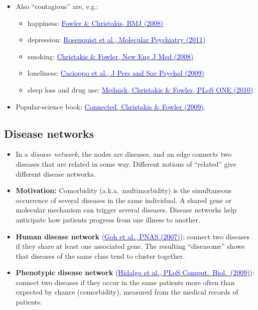 \documentclass[20pt]{extarticle}
\newcommand{\hrefc}[2]{\href{#1}{\textcolor{blue}{#2}}}
\begin{document}
\begin{itemize}
\item Also ``contagious'' are, e.g.:
	\begin{itemize}
	\item happiness: \hrefc{https://doi.org/10.1136/bmj.a2338}{Fowler \& Christakis, BMJ (2008)}
	\item depression: \hrefc{https://doi.org/10.1038/mp.2010.13}{Rosenquist et al., Molecular Psychiatry (2011)}
	\item smoking: \hrefc{https://doi.org/10.1056/NEJMsa0706154}{Christakis \& Fowler, New Eng J Med (2008)}
	\item loneliness: \hrefc{https://doi.org/10.1037/a0016076}{Cacioppo et al., J Pers and Soc Psychol (2009)}
	\item sleep loss and drug use: \hrefc{https://doi.org/10.1371/journal.pone.0009775}{Mednick, Christakis \& Fowler, PLoS ONE (2010)}
	\end{itemize}
\item Popular-science book: \hrefc{https://www.amazon.com/Connected-Surprising-Networks-Friends-Everything/dp/0316036137}{Connected, Christakis \& Fowler (2009)}.
\end{itemize}

\clearpage

\subsection*{Disease networks}

\begin{itemize}
\item In a \emph{disease network}, the nodes are diseases, and an edge connects two diseases that are related in some way. Different notions of ``related'' give different disease networks.
\item \textbf{Motivation:} Comorbidity (a.k.a.\ multimorbidity) is the simultaneous occurrence of several diseases in the same individual. A shared gene or molecular mechanism can trigger several diseases. Disease networks help anticipate how patients progress from one illness to another.
\item \textbf{Human disease network} (\hrefc{https://doi.org/10.1073/pnas.0701361104}{Goh et al., PNAS (2007)}): connect two diseases if they share at least one associated gene. The resulting ``diseasome'' shows that diseases of the same class tend to cluster together.
\item \textbf{Phenotypic disease network} (\hrefc{https://doi.org/10.1371/journal.pcbi.1000353}{Hidalgo et al., PLoS Comput.\ Biol.\ (2009)}): connect two diseases if they occur in the same patients more often than expected by chance (comorbidity), measured from the medical records of patients.
\end{itemize}
\end{document}

